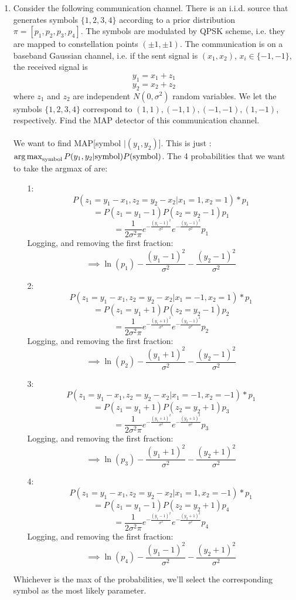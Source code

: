 \begin{enumerate}
  \item Consider the following communication channel. There is an i.i.d. source that generates symbols $\{ 1,2,3,4 \}$ according to a prior distribution $\pi = [p_1,p_2,p_3,p_4]$. The symbols are modulated by QPSK scheme, i.e. they are mapped to constellation points $(\pm 1, \pm 1)$. The communication is on a baseband Gaussian channel, i.e. if the sent signal is $(x_1,x_2)$, $x_i \in \{-1, -1\}$, the received signal is
    $$y_1 = x_1 + z_1$$
    $$y_2 = x_2 + z_2$$
    where $z_1$ and $z_2$ are independent $N(0,\sigma^2)$ random variables. We let the symbols $\{1,2,3,4\}$ correspond to $(1,1), (-1,1), (-1,-1), (1,-1)$, respectively. Find the MAP detector of this communication channel.\\\\

    We want to find MAP[symbol $ | (y_1,y_2)$]. This is just : $\operatorname*{arg\,max}_{\text{symbol}} P(y_1,y_2 | \text{symbol}) P(\text{symbol})$. The 4 probabilities that we want to take the argmax of are:
    \begin{enumerate}
      \item [1:]
        $$P(z_1 = y_1-x_1, z_2=y_2-x_2 | x_1=1,x_2=1) * p_1$$
        $$=P(z_1 = y_1-1)P(z_2 = y_2-1)p_1$$
        $$=\frac{1}{2 \sigma^2 \pi} e^{-\frac{(y_1-1)^2}{\sigma^2}} e^{-\frac{(y_2-1)^2}{\sigma^2}} p_1$$
        Logging, and removing the first fraction:
        $$\implies \ln(p_1) - \frac{(y_1-1)^2}{\sigma^2} - \frac{(y_2-1)^2}{\sigma^2}$$
      \item [2:]
        $$P(z_1 = y_1-x_1, z_2=y_2-x_2 | x_1=-1,x_2=1) * p_1$$
        $$=P(z_1 = y_1+1)P(z_2 = y_2-1)p_2$$
        $$=\frac{1}{2 \sigma^2 \pi} e^{-\frac{(y_1+1)^2}{\sigma^2}} e^{-\frac{(y_2-1)^2}{\sigma^2}} p_2$$
        Logging, and removing the first fraction:
        $$\implies \ln(p_2) - \frac{(y_1+1)^2}{\sigma^2} - \frac{(y_2-1)^2}{\sigma^2}$$
      \item [3:]
        $$P(z_1 = y_1-x_1, z_2=y_2-x_2 | x_1=-1,x_2=-1) * p_1$$
        $$=P(z_1 = y_1+1)P(z_2 = y_2+1)p_3$$
        $$=\frac{1}{2 \sigma^2 \pi} e^{-\frac{(y_1+1)^2}{\sigma^2}} e^{-\frac{(y_2+1)^2}{\sigma^2}} p_3$$
        Logging, and removing the first fraction:
        $$\implies \ln(p_3) - \frac{(y_1+1)^2}{\sigma^2} - \frac{(y_2+1)^2}{\sigma^2}$$
      \item [4:]
        $$P(z_1 = y_1-x_1, z_2=y_2-x_2 | x_1=1,x_2=-1) * p_1$$
        $$=P(z_1 = y_1-1)P(z_2 = y_2+1)p_4$$
        $$=\frac{1}{2 \sigma^2 \pi} e^{-\frac{(y_1-1)^2}{\sigma^2}} e^{-\frac{(y_2+1)^2}{\sigma^2}} p_4$$
        Logging, and removing the first fraction:
        $$\implies \ln(p_4) - \frac{(y_1-1)^2}{\sigma^2} - \frac{(y_2+1)^2}{\sigma^2}$$
    \end{enumerate}
    Whichever is the max of the probabilities, we'll select the corresponding symbol as the most likely parameter.


\end{enumerate}
